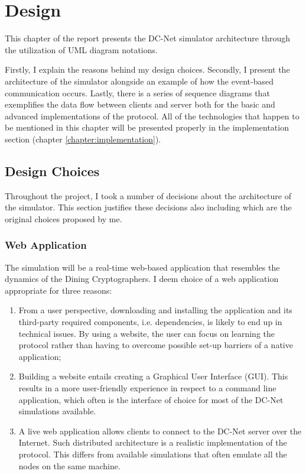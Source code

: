 \chapter{Design} \label{chapter:design}
This chapter of the report presents the DC-Net simulator architecture through the utilization of UML diagram notations.

Firstly, I explain the reasons behind my design choices. Secondly, I present the architecture of the simulator alongside an example of how the event-based communication occurs. Lastly, there is a series of sequence diagrams that exemplifies the data flow between clients and server both for the basic and advanced implementations of the protocol. All of the technologies that happen to be mentioned in this chapter will be presented properly in the implementation section (chapter \ref{chapter:implementation}).


\section{Design Choices}
Throughout the project, I took a number of decisions about the architecture of the simulator. This section justifies these decisions also including which are the original choices proposed by me. 

\subsection{Web Application}
The simulation will be a real-time web-based application that resembles the dynamics of the Dining Cryptographers. I deem choice of a web application appropriate for three reasons:
\begin{enumerate}
    \item From a user perspective, downloading and installing the application and its third-party required components, i.e. dependencies, is likely to end up in technical issues. By using a website, the user can focus on learning the protocol rather than having to overcome possible set-up barriers of a native application;
    \item Building a website entails creating a Graphical User Interface (GUI). This results in a more user-friendly experience in respect to a command line application, which often is the interface of choice for most of the DC-Net simulations available.
    \item A live web application allows clients to connect to the DC-Net server over the Internet. Such distributed architecture is a realistic implementation of the protocol. This differs from available simulations that often emulate all the nodes on the same machine.
\end{enumerate}

